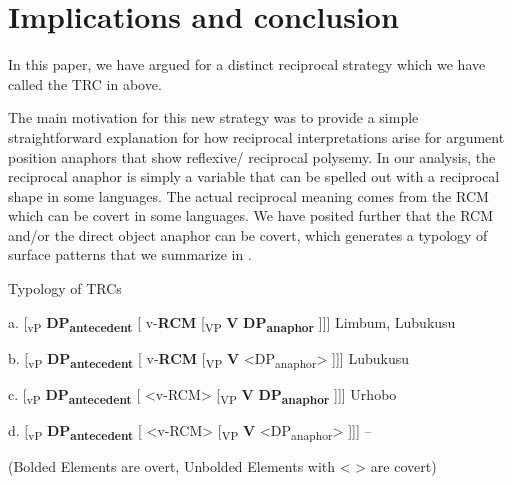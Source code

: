 \documentclass[output=paper]{langsci/langscibook}
\begin{document}
\section{Implications and conclusion}

  In this paper, we have argued for a distinct reciprocal strategy which we have called the TRC in  above. 

The main motivation for this new strategy was to provide a simple straightforward explanation for how reciprocal interpretations arise for argument position anaphors that show reflexive/ reciprocal polysemy. In our analysis, the reciprocal anaphor is simply a variable that can be spelled out with a reciprocal shape in some languages. The actual reciprocal meaning comes from the RCM which can be covert in some languages. We have posited further that the RCM and/or the direct object anaphor can be covert, which generates a typology of surface patterns that we summarize in .
 
\begin{table}
\caption{Typology of TRCs}


  a.  [\textsubscript{vP} \textbf{DP}\textbf{\textsubscript{antecedent}} [ v-\textbf{RCM}   [\textsubscript{VP} \textbf{V}  \textbf{DP}\textbf{\textsubscript{anaphor}} ]]]     Limbum, Lubukusu



  b.  [\textsubscript{vP} \textbf{DP}\textbf{\textsubscript{antecedent}} [ v-\textbf{RCM}   [\textsubscript{VP} \textbf{V}  <DP\textsubscript{anaphor}> ]]]    Lubukusu  



  c.  [\textsubscript{vP} \textbf{DP}\textbf{\textsubscript{antecedent}} [ <v-RCM>   [\textsubscript{VP} \textbf{V}  \textbf{DP}\textbf{\textsubscript{anaphor}} ]]]    Urhobo



  d.  [\textsubscript{vP} \textbf{DP}\textbf{\textsubscript{antecedent}} [ <v-RCM>   [\textsubscript{VP} \textbf{V}  <DP\textsubscript{anaphor}> ]]]    --



    (Bolded Elements are overt, Unbolded Elements with < > are covert)

\label{tab:1}
\end{table} 
\end{document}
